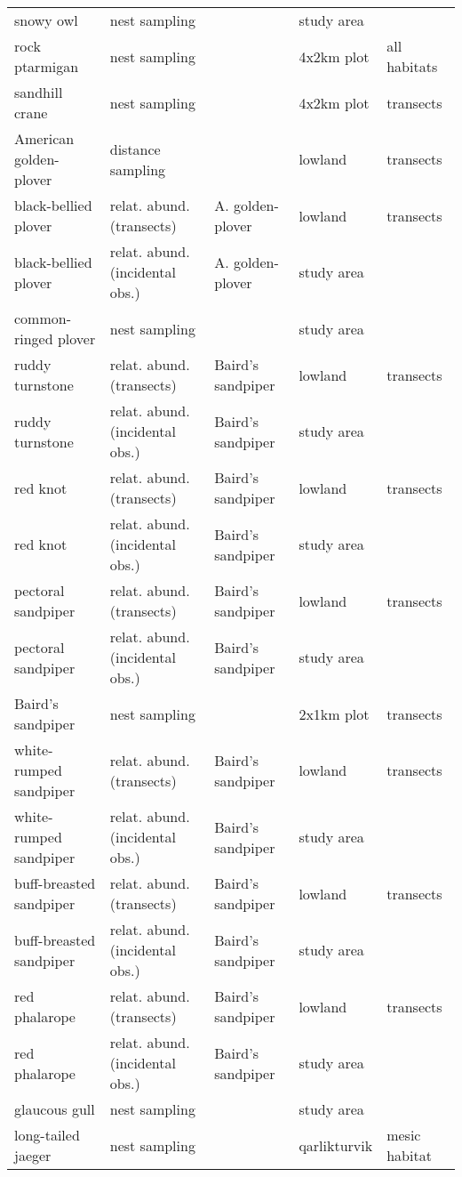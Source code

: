 \begin{table}[H]
\begin{tabularx}{\textwidth}{lllll}
  snowy owl & nest sampling &  & study area &  \\ 
  rock ptarmigan & nest sampling &  & 4x2km plot & all habitats \\ 
  sandhill crane & nest sampling &  & 4x2km plot & transects \\ 
  American golden-plover & distance sampling &  & lowland & transects \\ 
  black-bellied plover & relat. abund. (transects) & A. golden-plover & lowland & transects \\ 
  black-bellied plover & relat. abund. (incidental obs.) & A. golden-plover & study area &  \\ 
  common-ringed plover & nest sampling &  & study area &  \\ 
  ruddy turnstone & relat. abund. (transects) & Baird’s sandpiper & lowland & transects \\ 
  ruddy turnstone & relat. abund. (incidental obs.) & Baird’s sandpiper & study area &  \\ 
  red knot & relat. abund. (transects) & Baird’s sandpiper & lowland & transects \\ 
  red knot & relat. abund. (incidental obs.) & Baird’s sandpiper & study area &  \\ 
  pectoral sandpiper & relat. abund. (transects) & Baird’s sandpiper & lowland & transects \\ 
  pectoral sandpiper & relat. abund. (incidental obs.) & Baird’s sandpiper & study area &  \\ 
  Baird’s sandpiper & nest sampling &  & 2x1km plot & transects \\ 
  white-rumped sandpiper & relat. abund. (transects) & Baird’s sandpiper & lowland & transects \\ 
  white-rumped sandpiper & relat. abund. (incidental obs.) & Baird’s sandpiper & study area &  \\ 
  buff-breasted sandpiper & relat. abund. (transects) & Baird’s sandpiper & lowland & transects \\ 
  buff-breasted sandpiper & relat. abund. (incidental obs.) & Baird’s sandpiper & study area &  \\ 
  red phalarope & relat. abund. (transects) & Baird’s sandpiper & lowland & transects \\ 
  red phalarope & relat. abund. (incidental obs.) & Baird’s sandpiper & study area &  \\ 
  glaucous gull & nest sampling &  & study area &  \\ 
  long-tailed jaeger & nest sampling &  & qarlikturvik & mesic habitat \\ 

\end{tabularx}
\end{table}
